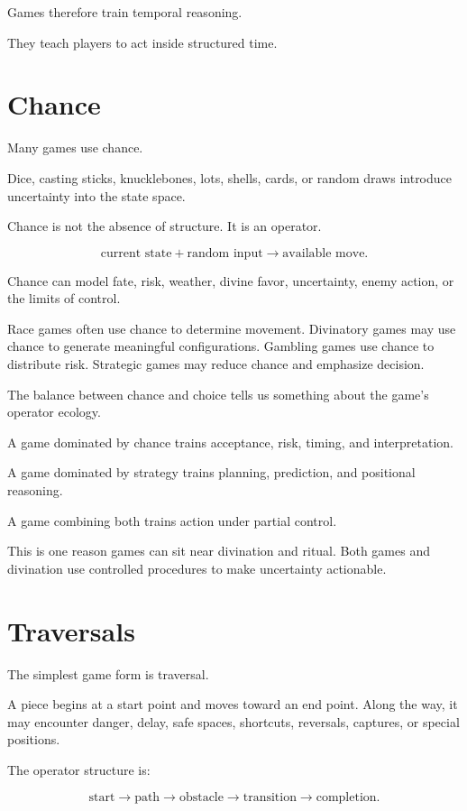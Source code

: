 \documentclass[11pt]{book}
\begin{document}
Games therefore train temporal reasoning.

They teach players to act inside structured time.

\section{Chance}

Many games use chance.

Dice, casting sticks, knucklebones, lots, shells, cards, or random draws introduce uncertainty into the state space.

Chance is not the absence of structure. It is an operator.

\[
\text{current state} + \text{random input} \rightarrow \text{available move}.
\]

Chance can model fate, risk, weather, divine favor, uncertainty, enemy action, or the limits of control.

Race games often use chance to determine movement. Divinatory games may use chance to generate meaningful configurations. Gambling games use chance to distribute risk. Strategic games may reduce chance and emphasize decision.

The balance between chance and choice tells us something about the game's operator ecology.

A game dominated by chance trains acceptance, risk, timing, and interpretation.

A game dominated by strategy trains planning, prediction, and positional reasoning.

A game combining both trains action under partial control.

This is one reason games can sit near divination and ritual. Both games and divination use controlled procedures to make uncertainty actionable.

\section{Traversals}

The simplest game form is traversal.

A piece begins at a start point and moves toward an end point. Along the way, it may encounter danger, delay, safe spaces, shortcuts, reversals, captures, or special positions.

The operator structure is:

\[
\text{start}
\rightarrow
\text{path}
\rightarrow
\text{obstacle}
\rightarrow
\text{transition}
\rightarrow
\text{completion}.
\]
\end{document}
